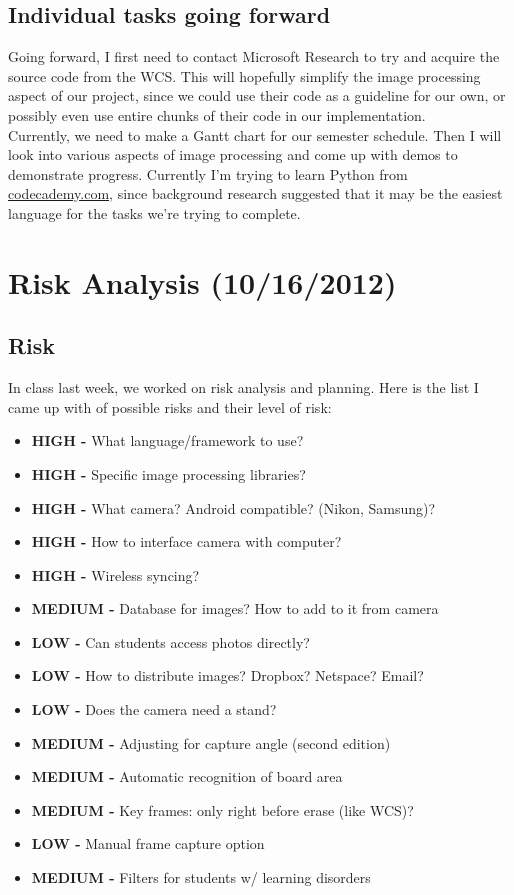\documentclass[]{article}
\begin{document}
		\subsection*{Individual tasks going forward}	
	Going forward, I first need to contact Microsoft Research to try and acquire the source code from the WCS.  This will hopefully simplify the image processing aspect of our project, since we could use their code as a guideline for our own, or possibly even use entire chunks of their code in our implementation. \\
	\indent Currently, we need to make a Gantt chart for our semester schedule.  Then I will look into various aspects of image processing and come up with demos to demonstrate progress.  Currently I'm trying to learn Python from \url{codecademy.com}, since background research suggested that it may be the easiest language for the tasks we're trying to complete.
	
	
	\section{Risk Analysis (10/16/2012)}
		\subsection*{Risk}	
	In class last week, we worked on risk analysis and planning. Here is the list I came up with of possible risks and their level of risk:
	\begin{itemize} \itemsep -2pt
	\item \textbf{HIGH -} What language/framework to use?
	\item \textbf{HIGH -} Specific image processing libraries?
	\item \textbf{HIGH -} What camera? Android compatible? (Nikon, Samsung)?
	\item \textbf{HIGH -} How to interface camera with computer?
	\item \textbf{HIGH -} Wireless syncing?
	\item \textbf{MEDIUM -} Database for images? How to add to it from camera
	\item \textbf{LOW -} Can students access photos directly?
	\item \textbf{LOW -} How to distribute images? Dropbox? Netspace? Email?
	\item \textbf{LOW -} Does the camera need a stand?
	\item \textbf{MEDIUM -} Adjusting for capture angle (second edition)
	\item \textbf{MEDIUM -} Automatic recognition of board area
	\item \textbf{MEDIUM -} Key frames: only right before erase (like WCS)?
	\item \textbf{LOW -} Manual frame capture option
	\item \textbf{MEDIUM -} Filters for students w/ learning disorders
	\end{itemize}		
	
\end{document}
